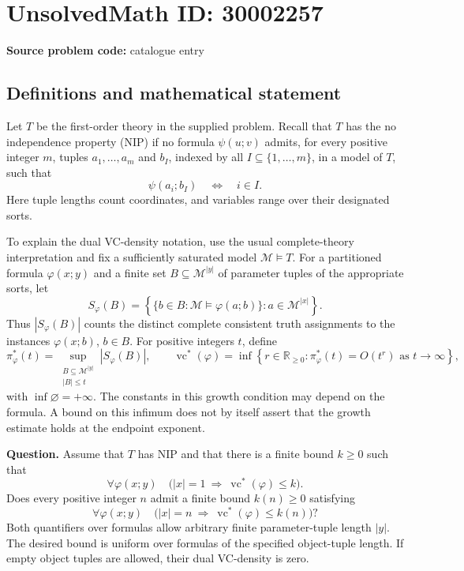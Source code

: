 \documentclass[11pt]{article}
\newcommand{\R}{\mathbb{R}}
\begin{document}
\section*{UnsolvedMath ID: 30002257}
\textbf{Source problem code:} catalogue entry
\subsection{Definitions and mathematical statement}
Let \(T\) be the first-order theory in the supplied problem. Recall that \(T\) has the no independence property (NIP) if no formula \(\psi(u;v)\) admits, for every positive integer \(m\), tuples \(a_1,\ldots,a_m\) and \(b_I\), indexed by all \(I\subseteq\{1,\ldots,m\}\), in a model of \(T\), such that
\[
\psi(a_i;b_I)\quad\Longleftrightarrow\quad i\in I.
\]
Here tuple lengths count coordinates, and variables range over their designated sorts.

To explain the dual VC-density notation, use the usual complete-theory interpretation and fix a sufficiently saturated model \(\mathcal M\models T\). For a partitioned formula \(\varphi(x;y)\) and a finite set \(B\subseteq\mathcal M^{|y|}\) of parameter tuples of the appropriate sorts, let
\[
S_\varphi(B)=\left\{\{b\in B:\mathcal M\models\varphi(a;b)\}:a\in\mathcal M^{|x|}\right\}.
\]
Thus \(|S_\varphi(B)|\) counts the distinct complete consistent truth assignments to the instances \(\varphi(x;b)\), \(b\in B\). For positive integers \(t\), define
\[
\pi^*_\varphi(t)=\sup_{\substack{B\subseteq\mathcal M^{|y|}\\|B|\leq t}}|S_\varphi(B)|,
\qquad
\operatorname{vc}^*(\varphi)=\inf\left\{r\in\R_{\geq0}:\pi^*_\varphi(t)=O(t^r)\text{ as }t\to\infty\right\},
\]
with \(\inf\varnothing=+\infty\). The constants in this growth condition may depend on the formula. A bound on this infimum does not by itself assert that the growth estimate holds at the endpoint exponent.

\textbf{Question.} Assume that \(T\) has NIP and that there is a finite bound \(k\geq0\) such that
\[
\forall\varphi(x;y)\quad\bigl(|x|=1\ \Longrightarrow\ \operatorname{vc}^*(\varphi)\leq k\bigr).
\]
Does every positive integer \(n\) admit a finite bound \(k(n)\geq0\) satisfying
\[
\forall\varphi(x;y)\quad\bigl(|x|=n\ \Longrightarrow\ \operatorname{vc}^*(\varphi)\leq k(n)\bigr)?
\]
Both quantifiers over formulas allow arbitrary finite parameter-tuple length \(|y|\). The desired bound is uniform over formulas of the specified object-tuple length. If empty object tuples are allowed, their dual VC-density is zero.
\end{document}

